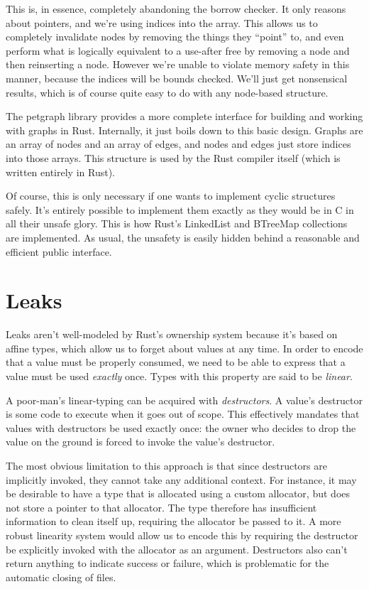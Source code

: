 This is, in essence, completely abandoning the borrow checker. It only reasons
about pointers, and we're using indices into the array. This allows us to
completely invalidate nodes by removing the things they ``point'' to, and even
perform what is logically equivalent to a use-after free by removing a node
and then reinserting a node. However we're unable to violate
memory safety in this manner, because the indices will be bounds checked.
We'll just get nonsensical results, which is of course quite easy to do with
any node-based structure.

The petgraph library \cite{petgraph} provides a more complete interface for
building and working with graphs in Rust. Internally, it just boils down to
this basic design. Graphs are an array of nodes and an array of edges,
and nodes and edges just store indices into those arrays. This structure is
used by the Rust compiler itself (which is written entirely in Rust).

Of course, this is only necessary if one wants to implement cyclic structures
safely. It's entirely possible to implement them exactly as they would be in C
in all their unsafe glory. This is how Rust's LinkedList and BTreeMap
collections are implemented. As usual, the unsafety is easily hidden behind
a reasonable and efficient public interface.





\section{Leaks}

Leaks aren't well-modeled by Rust's ownership system because it's based on affine
types, which allow us to forget about values at any time.
In order to encode that a value must be properly consumed, we need to be able
to express that a value must be used \emph{exactly} once. Types with this property
are said to be \emph{linear}.

A poor-man's linear-typing can be acquired with \emph{destructors}. A value's destructor
is some code to execute when it goes out of scope. This effectively mandates that
values with destructors be used exactly once: the owner who decides to drop the
value on the ground is forced to invoke the value's destructor.

The most obvious limitation to this approach is that since destructors are implicitly invoked,
they cannot take any additional context. For instance, it may be desirable
to have a type that is allocated using a custom allocator, but does not store
a pointer to that allocator. The type therefore has insufficient information
to clean itself up, requiring the allocator be passed to it. A more robust linearity
system would allow us to encode this by requiring the destructor be explicitly invoked with
the allocator as an argument. Destructors also can't return anything to indicate
success or failure, which is problematic for the automatic closing of files.

